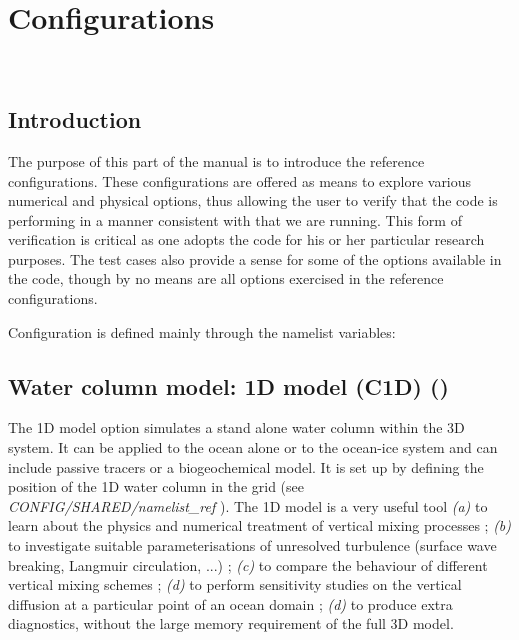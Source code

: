 \chapter{Configurations}
\label{CFG}
\minitoc

\newpage
$\ $\newline    %

\section{Introduction}
\label{CFG_intro}


The purpose of this part of the manual is to introduce the \NEMO reference configurations. 
These configurations are offered as means to explore various numerical and physical options, 
thus allowing the user to verify that the code is performing in a manner consistent with that 
we are running. This form of verification is critical as one adopts the code for his or her particular 
research purposes. The test cases also provide a sense for some of the options available 
in the code, though by no means are all options exercised in the reference configurations.

Configuration is defined mainly through the  namelist variables:

\section{Water column model: 1D model (C1D) () }
\label{CFG_c1d}

The 1D model option simulates a stand alone water column within the 3D \NEMO system. 
It can be applied to the ocean alone or to the ocean-ice system and can include passive tracers 
or a biogeochemical model. It is set up by defining the position of the 1D water column in the grid 
(see \textit{CONFIG/SHARED/namelist\_ref} ). 
The 1D model is a very useful tool  
\textit{(a)} to learn about the physics and numerical treatment of vertical mixing processes ; 
\textit{(b)} to investigate suitable parameterisations of unresolved turbulence (surface wave
breaking, Langmuir circulation, ...) ; 
\textit{(c)} to compare the behaviour of different vertical mixing schemes  ; 
\textit{(d)} to perform sensitivity studies on the vertical diffusion at a particular point of an ocean domain ; 
\textit{(d)} to produce extra diagnostics, without the large memory requirement of the full 3D model.

